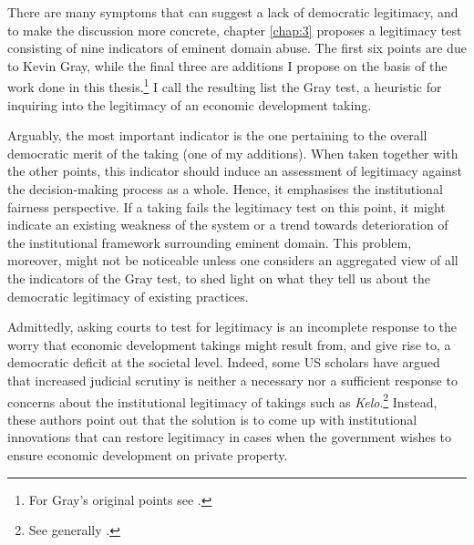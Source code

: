 
There are many symptoms that can suggest a lack of democratic legitimacy, and to make the discussion more concrete, chapter \ref{chap:3} proposes a legitimacy test consisting of nine indicators of eminent domain abuse. The first six points are due to Kevin Gray, while the final three are additions I propose on the basis of the work done in this thesis.\footnote{For Gray's original points see \cite{gray11}.} I call the resulting list the Gray test, a heuristic for inquiring into the legitimacy of an economic development taking. 

Arguably, the most important indicator is the one pertaining to the overall democratic merit of the taking (one of my additions). When taken together with the other points, this indicator should induce an assessment of legitimacy against the decision-making process as a whole. Hence, it emphasises the institutional fairness perspective. If a taking fails the legitimacy test on this point, it might indicate an existing weakness of the system or a trend towards deterioration of the institutional framework surrounding eminent domain. This problem, moreover, might not be noticeable unless one considers an aggregated view of all the indicators of the Gray test, to shed light on what they tell us about the democratic legitimacy of existing practices.

Admittedly, asking courts to test for legitimacy is an incomplete response to the worry that economic development takings might result from, and give rise to, a democratic deficit at the societal level. Indeed, some US scholars have argued that increased judicial scrutiny is neither a necessary nor a sufficient response to concerns about the institutional legitimacy of takings such as {\it Kelo}.\footnote{See generally \cite{lehavi07,heller08}.} Instead, these authors point out that the solution is to come up with institutional innovations that can restore legitimacy in cases when the government wishes to ensure economic development on private property.


